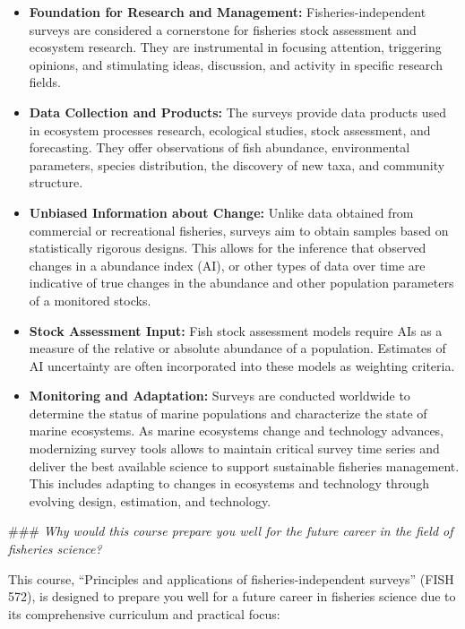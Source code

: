 \documentclass[
  letterpaper,
  oneside,
  open=any]{scrbook}
\providecommand{\tightlist}{%
  \setlength{\itemsep}{0pt}\setlength{\parskip}{0pt}}\usepackage{longtable,booktabs,array}
\begin{document}
\begin{itemize}
\tightlist
\item
  \textbf{Foundation for Research and Management:} Fisheries-independent
  surveys are considered a cornerstone for fisheries stock assessment
  and ecosystem research. They are instrumental in focusing attention,
  triggering opinions, and stimulating ideas, discussion, and activity
  in specific research fields.
\item
  \textbf{Data Collection and Products:} The surveys provide data
  products used in ecosystem processes research, ecological studies,
  stock assessment, and forecasting. They offer observations of fish
  abundance, environmental parameters, species distribution, the
  discovery of new taxa, and community structure.
\item
  \textbf{Unbiased Information about Change:} Unlike data obtained from
  commercial or recreational fisheries, surveys aim to obtain samples
  based on statistically rigorous designs. This allows for the inference
  that observed changes in a abundance index (AI), or other types of
  data over time are indicative of true changes in the abundance and
  other population parameters of a monitored stocks.
\item
  \textbf{Stock Assessment Input:} Fish stock assessment models require
  AIs as a measure of the relative or absolute abundance of a
  population. Estimates of AI uncertainty are often incorporated into
  these models as weighting criteria.
\item
  \textbf{Monitoring and Adaptation:} Surveys are conducted worldwide to
  determine the status of marine populations and characterize the state
  of marine ecosystems. As marine ecosystems change and technology
  advances, modernizing survey tools allows to maintain critical survey
  time series and deliver the best available science to support
  sustainable fisheries management. This includes adapting to changes in
  ecosystems and technology through evolving design, estimation, and
  technology.
\end{itemize}

\#\#\# \emph{Why would this course prepare you well for the future
career in the field of fisheries science?}

This course, ``Principles and applications of fisheries-independent
surveys'' (FISH 572), is designed to prepare you well for a future
career in fisheries science due to its comprehensive curriculum and
practical focus:
\end{document}
